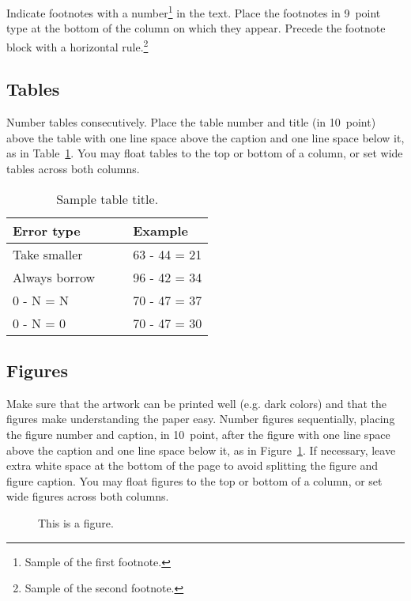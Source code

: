 \documentclass[10pt,letterpaper]{article}
\begin{document}
Indicate footnotes with a number\footnote{Sample of the first
footnote.} in the text. Place the footnotes in 9~point type at the
bottom of the column on which they appear. Precede the footnote block
with a horizontal rule.\footnote{Sample of the second footnote.}


\subsection{Tables}

Number tables consecutively. Place the table number and title (in
10~point) above the table with one line space above the caption and
one line space below it, as in Table~\ref{sample-table}. You may float
tables to the top or bottom of a column, or set wide tables across
both columns.

\begin{table}[!ht]
\begin{center} 
\caption{Sample table title.} 
\label{sample-table} 
\vskip 0.12in
\begin{tabular}{ll} 
\hline
Error type    &  Example \\
\hline
Take smaller        &   63 - 44 = 21 \\
Always borrow~~~~   &   96 - 42 = 34 \\
0 - N = N           &   70 - 47 = 37 \\
0 - N = 0           &   70 - 47 = 30 \\
\hline
\end{tabular} 
\end{center} 
\end{table}


\subsection{Figures}

Make sure that the artwork can be printed well (e.g. dark colors) and that 
the figures make understanding the paper easy.
 Number figures sequentially, placing the figure
number and caption, in 10~point, after the figure with one line space
above the caption and one line space below it, as in
Figure~\ref{sample-figure}. If necessary, leave extra white space at
the bottom of the page to avoid splitting the figure and figure
caption. You may float figures to the top or bottom of a column, or
set wide figures across both columns.

\begin{figure}[ht]
\begin{center}
\end{center}
\caption{This is a figure.} 
\label{sample-figure}
\end{figure}
\end{document}
